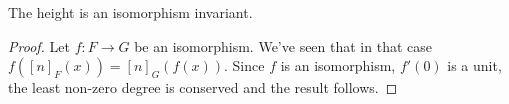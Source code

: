 \begin{lemma*}
	The height is an isomorphism invariant.
\end{lemma*}

\begin{proof}
	Let $f: F \to G$ be an isomorphism.
	We've seen that in that case
	$
		f\left(\left[n\right]_F \left(x\right)\right)
		=
		\left[n\right]_G \left(f\left(x\right)\right)
	$.
	Since $f$ is an isomorphism, $f'\left(0\right)$ is a unit, the least non-zero degree is conserved and the result follows.
\end{proof}


